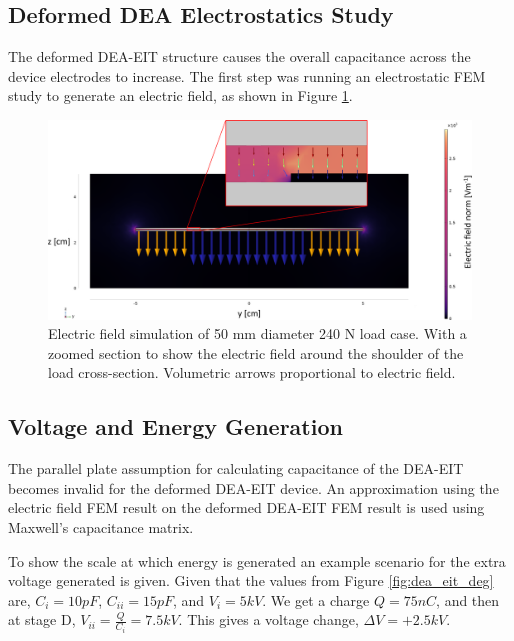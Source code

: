 \subsection{Deformed DEA Electrostatics Study}
The deformed DEA-EIT structure causes the overall capacitance across the device electrodes to increase. The first step was running an electrostatic FEM study to generate an electric field, as shown in Figure \ref{fig:FEM_DEA-EIT_cap}.
\begin{figure}[H]
	\centering
	\includegraphics[width=\linewidth]{Figures/d50mm_load_labelled_shoulder_zoom.png}
	\caption{Electric field simulation of 50 mm diameter 240 N load case. With a zoomed section to show the electric field around the shoulder of the load cross-section. Volumetric arrows proportional to electric field.}
	\label{fig:FEM_DEA-EIT_cap}
\end{figure}


\subsection{Voltage and Energy Generation}
\label{subsec:Voltage and Energy Generation}
The parallel plate assumption for calculating capacitance of the DEA-EIT becomes invalid for the deformed DEA-EIT device. An approximation using the electric field FEM result on the deformed DEA-EIT FEM result is used using Maxwell's capacitance matrix.

To show the scale at which energy is generated an example scenario for the extra voltage generated is given. Given that the values from Figure \ref{fig:dea_eit_deg} are, $C_i = 10 pF$, $C_{ii} = 15 pF$, and $V_i = 5 kV$. We get a charge $Q = 75 nC$, and then at stage D, $V_{ii} = \frac{Q}{C_{i}} = 7.5 kV$. This gives a voltage change, $\Delta V = +2.5 kV$. 

